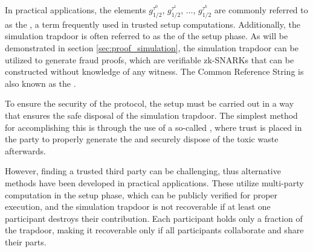 In practical applications, the elements $g_{1/2}^{\tau^0}$, $g_{1/2}^{\tau^1}$, $\ldots$, $g_{1/2}^{\tau^k}$ are commonly referred to as the , a term frequently used in trusted setup computations. Additionally, the simulation trapdoor is often referred to as the  of the setup phase. As will be demonstrated in section \ref{sec:proof_simulation}, the simulation trapdoor can be utilized to generate fraud proofs, which are verifiable zk-SNARKs that can be constructed without knowledge of any witness. The Common Reference String is also known as the .

To ensure the security of the protocol, the setup must be carried out in a way that ensures the safe disposal of the simulation trapdoor. The simplest method for accomplishing this is through the use of a so-called , where trust is placed in the party to properly generate the  and securely dispose of the toxic waste afterwards.

However, finding a trusted third party can be challenging, thus alternative methods have been developed in practical applications. These utilize multi-party computation in the setup phase, which can be publicly verified for proper execution, and the simulation trapdoor is not recoverable if at least one participant destroys their contribution. Each participant holds only a fraction of the trapdoor, making it recoverable only if all participants collaborate and share their parts.

